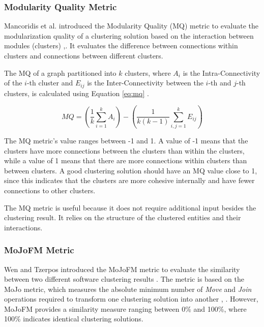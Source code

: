 \documentclass[12pt, a4paper, twoside]{report}
\begin{document}
\subsubsection{Modularity Quality Metric}
\label{subsec:mq}

Mancoridis et al. introduced the Modularity Quality (MQ) metric to evaluate the modularization quality of a clustering solution based on the interaction between modules (clusters) \cite{b101},\cite{b10}. It evaluates the difference between connections within clusters and connections between different clusters.

The MQ of a graph partitioned into \( k \) clusters, where \( A_i \) is the Intra-Connectivity of the \( i \)-th cluster and \( E_{ij} \) is the Inter-Connectivity between the \( i \)-th and \( j \)-th clusters, is calculated using Equation \eqref{eq:mq} \cite{b2}.

\begin{equation}
MQ = \left( \frac{1}{k} \sum_{i=1}^{k} A_i \right) - \left( \frac{1}{k(k-1)} \sum_{i,j=1}^{k} E_{ij} \right)
\label{eq:mq}
\end{equation}

The MQ metric's value ranges between -1 and 1. A value of -1 means that the clusters have more connections between the clusters than within the clusters, while a value of 1 means that there are more connections within clusters than between clusters. A good clustering solution should have an MQ value close to 1, since this indicates that the clusters are more cohesive internally and have fewer connections to other clusters.

The MQ metric is useful because it does not require additional input besides the clustering result. It relies on the structure of the clustered entities and their interactions.

\subsubsection{MoJoFM Metric}
\label{subsec:mojofm}
Wen and Tzerpos introduced the MoJoFM metric to evaluate the similarity between two different software clustering results \cite{mojofm}. The metric is based on the MoJo metric, which measures the absolute minimum number of \textit{Move} and \textit{Join} operations required to transform one clustering solution into another \cite{b3}, \cite{mojofm}. However, MoJoFM provides a similarity measure ranging between 0\% and 100\%, where 100\% indicates identical clustering solutions.
\end{document}
